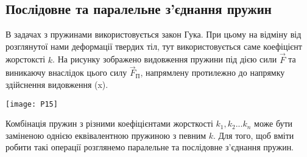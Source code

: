 \documentclass[a4paper,12pt]{article}
\begin{document}
\newpage
\subsection{Послідовне та паралельне з'єднання пружин}
В задачах з пружинами використовується закон Гука. При цьому на відміну від розглянутої нами деформації твердих тіл, тут використовується саме коефіцієнт жорстоксті $k$. На рисунку зображено видовження пружини під дією сили $\vec{F}$ та виникаючу внаслідок цього силу $\vec{F}_{\text{П}}$, напрямлену протилежно до напрямку здійснення видовження (x).
\begin{center}
\texttt{[image: P15]}
\end{center}
Комбінація пружин з різними коефіцієнтами жорсткості $k_1, k_2...k_n$ може бути заміненою однією еквівалентною пружиною з певним $k$. Для того, щоб вміти робити такі операції розглянемо паралельне та послідовне з'єднання пружин. 
\end{document}
